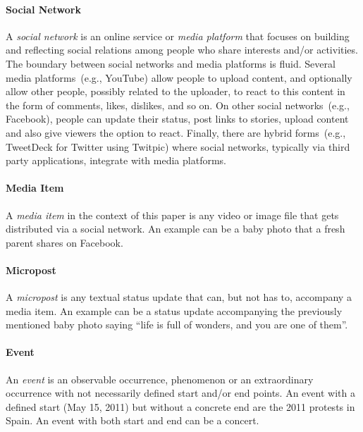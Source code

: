 \documentclass{acm_proc_article-sp}
\let\oldemph\emph
\renewcommand{\emph}[1]{\oldemph{\fontsize{9}{9}\selectfont #1}}
\begin{document}
\paragraph{Social Network}
A \emph{social network} is an online service or \emph{media platform} that focuses on building and reflecting social relations among people who share interests and/or activities.
The boundary between social networks and media platforms is fluid.
Several media platforms~(e.g., YouTube) allow people to upload content,
and optionally allow other people, possibly related to the uploader,
to react to this content in the form of comments, likes, dislikes, and so on.
On other social networks~(e.g., Facebook), people can update their status, post links to stories,
upload content and also give viewers the option to react.
Finally, there are hybrid forms~(e.g., TweetDeck for Twitter using Twitpic) where social networks,
typically via third party applications,
integrate with media platforms.

\paragraph{Media Item}
A \emph{media item} in the context of this paper is any video or image file that gets distributed via a social network.
An example can be a baby photo that a fresh parent shares on Facebook. 

\paragraph{Micropost}
A \emph{micropost} is any textual status update that can,
but not has to,
accompany a media item.
An example can be a status update accompanying the previously mentioned baby photo saying ``life is full of wonders, and you are one of them''.

\paragraph{Event}
An \emph{event} is an observable occurrence, phenomenon or an extraordinary occurrence with not necessarily defined start and/or end points.
An event with a defined start (May 15, 2011) but without a concrete end
are the 2011 protests in Spain.
An event with both start and end can be a concert.
\end{document}
